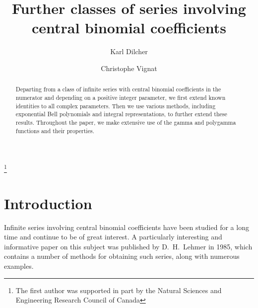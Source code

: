 \documentclass{amsart}
\theoremstyle{definition}
\theoremstyle{remark}
\numberwithin{equation}{section}
\begin{document}
\title[Series involving central binomial coefficients]{Further classes of 
series involving central binomial coefficients}

\author{Karl Dilcher}
\address{Department of Mathematics and Statistics\\
 Dalhousie University\\
         Halifax, Nova Scotia, B3H 4R2, Canada}

\author{Christophe Vignat}
\address{CentraleSup\'elec, Universit\'e Paris-Saclay, Gif-sur-Yvette, France and Department of
Mathematics, Tulane University, New Orleans, LA 70118, USA}
\thanks{The first author was supported in part by the Natural Sciences and 
Engineering Research Council of Canada}

\setcounter{equation}{0}

\begin{abstract}
Departing from a class of infinite series with central binomial coefficients in
the numerator and depending on a positive integer parameter, we first extend
known identities to all complex parameters. Then we use various methods,
including exponential Bell polynomials and integral representations, to further
extend these results. Throughout the paper, we make extensive use of the gamma 
and polygamma functions and their properties.
\end{abstract}

\maketitle

\section{Introduction}\label{sec:1}

Infinite series involving central binomial coefficients have been studied for
a long time and continue to be of great interest. A particularly interesting 
and informative paper on this subject was published by D.~H.~Lehmer \cite{Le}
in 1985, which contains a number of methods for obtaining such series, along
with numerous examples. 
\end{document}
